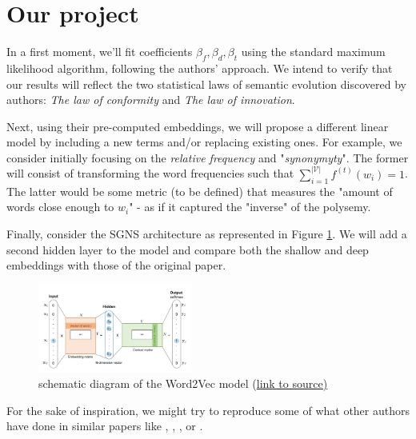 \documentclass[11pt, twocolumn]{extarticle}
\newcommand{\word}[1]{w_{#1}}
\newcommand{\freq}[2]{f^{(#2)}(w_{#1})}
\begin{document}
\section{Our project}

In a first moment, we'll fit coefficients \(\beta_f, \beta_d, \beta_t\) using the standard maximum likelihood algorithm, following the authors' approach. We intend to verify that our results will reflect the two statistical laws of semantic evolution discovered by authors: \textit{The law of conformity} and \textit{The law of innovation}.
\par

Next, using their pre-computed embeddings, we will propose a different linear model by including a new terms and/or replacing existing ones. For example, we consider initially focusing on the \textit{relative frequency} and "\textit{synonymyty}". The former will consist of transforming the word frequencies such that $\sum^{|\mathcal{V}|}_{i=1} \freq{i}{t} = 1$. The latter would be some metric (to be defined) that measures the "amount of words close enough to $\word{i}$" - as if it captured the "inverse" of the polysemy.
\par

Finally, consider the SGNS architecture as represented in Figure \ref{word2vec-schematic}. We will add a second hidden layer to the model and compare both the shallow and deep embeddings with those of the original paper.

\begin{figure}[H]
    \centering
    \includegraphics[width=0.45\textwidth]{word2vec.png}
    \caption{
        \label{word2vec-schematic}
        schematic diagram of the Word2Vec model (\href{https://lilianweng.github.io/lil-log/2017/10/15/learning-word-embedding.html}{link to source)}
    }
\end{figure}

For the sake of inspiration, we might try to reproduce some of what other authors have done in similar papers like \cite{dubossarsky-etal-2017-outta},  \cite{dynamic-word-embeddings}, \cite{carlo2019training}, or \cite{delpech2018unsupervised}.



\end{document}
